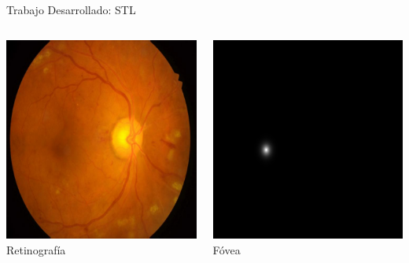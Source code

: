 \documentclass[xcolor=dvipsnames,table]{beamer}
\begin{document}
\begin{frame}{Trabajo Desarrollado: STL}
\begin{columns}[T]
\begin{minipage}[t]{0.35\textwidth}
	\centering
	\includegraphics[width=\textwidth]{my_images/ML/IDRiD_010.jpg}\\[1ex]
	{\small Retinografía}
\end{minipage}\hfill
\begin{minipage}[t]{0.35\textwidth}
	\centering
	\includegraphics[width=\textwidth]{my_images/ML/fovea_10.jpg}\\[1ex]
	{\small Fóvea}
\end{minipage}
\end{columns}
\end{frame}
\end{document}
